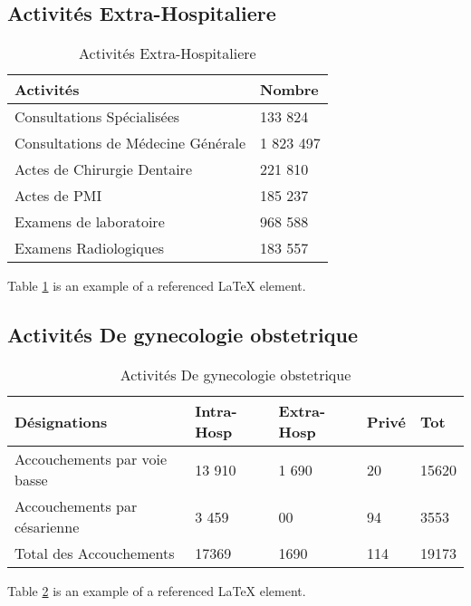 \subsection{Activités Extra-Hospitaliere}
\begin{table}[h!]
\begin{center}
\begin{tabular}{|p{11cm}|p{2cm}|}
\hline
Activités	                           &Nombre\\
\hline
Consultations Spécialisées	         &133 824\\
Consultations de Médecine Générale	 &1 823 497\\
Actes de Chirurgie Dentaire	         &221 810\\
Actes de PMI	                       &185 237\\
Examens de laboratoire	             &968 588\\
Examens Radiologiques	               &183 557\\
\hline
\end{tabular}
\end{center}
\caption{Activités Extra-Hospitaliere}
\label{table:7}
\end{table}
Table \ref{table:7} is an example of a referenced \LaTeX{} element.

\subsection{Activités De gynecologie obstetrique}
\begin{table}[h!]
\begin{center}
\begin{tabular}{|p{6cm}|p{2cm}|p{2cm}|p{1cm}|p{1cm}|}
\hline
Désignations	                &Intra-Hosp	  &Extra-Hosp  &Privé	&Tot\\
\hline
Accouchements par voie basse	&13 910	      &1 690	     &20	  &15620\\
Accouchements par césarienne	&3 459	      &00	         &94	  &3553\\
\hline
Total des Accouchements	      &17369	      &1690	       &114	  &19173\\
\hline
\end{tabular}
\end{center}
\caption{Activités De gynecologie obstetrique}
\label{table:8}
\end{table}
Table \ref{table:8} is an example of a referenced \LaTeX{} element.


